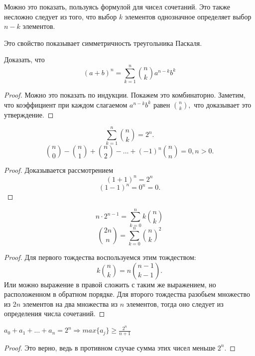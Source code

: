 \begin{solution}
    Можно это показать, пользуясь формулой для чисел сочетаний. Это также несложно следует из того, что выбор $k$ элементов однозначное определяет выбор $n - k$ элементов.
\end{solution}

Это свойство показывает симметричность треугольника Паскаля.

\begin{theorem} 
Доказать, что
    $$(a + b) ^ n = \sum_{k = 1} ^ {n} \binom{n}{k} a ^{n - k} b^{k}$$
\end{theorem}

\begin{proof}
    Можно это показать по индукции. Покажем это комбинаторно. Заметим, что коэффициент при каждом слагаемом $a^{n - k} b ^ {k}$ равен $\binom{n}{k},$ что доказывает это утверждение.
\end{proof}

\begin{corollary}
    $$\sum_{k = 1} ^ {n} \binom{n}{k} = 2 ^ n.$$
  $$\binom{n}{0} - \binom{n}{1} + \binom{n}{2} - \ldots + (-1) ^ n \binom{n}{n} = 0, n > 0.$$
\end{corollary}

\begin{proof}
    Доказывается рассмотрением 
    $$(1 + 1) ^ n = 2 ^ n$$
    $$(1 - 1) ^ n = 0 ^ n = 0.$$
\end{proof}

\begin{proposition}
$$n \cdot 2^{n-1} = \sum_{k = 0}^{n}k\binom{n}{k}$$
$$\binom{2n}{n} = \sum_{k = 0} ^ {n} \binom{n}{k} ^ 2$$
\end{proposition}

\begin{proof}
Для первого тождества воспользуемся этим тождеством:
$$k\binom{n}{k} = n \binom{n - 1}{k - 1}.$$
Или можно выражение в правой сложить с таким же выражением, но расположенном в обратном порядке. Для второго тождества разобьем множество из $2n$ элементов на два множества из $n$ элементов, тогда оно следует из определения числа сочетаний.
\end{proof}

\begin{lemma}
    $a_0 + a_1 + \ldots + a_n = 2 ^ n \Longrightarrow max \{a_j \} \geq \frac{2^n}{n + 1}$
\end{lemma}

\begin{proof}
    Это верно, ведь в противном случае сумма этих чисел меньше $2^n.$
\end{proof}

